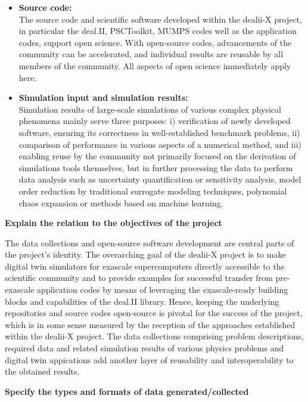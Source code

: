 \documentclass[a4paper,12pt]{article}
\begin{document}
\begin{itemize}
    \item  \textbf{Source code:}\\
    The source code and scientific software developed within the dealii-X project, in particular the deal.II, PSCToolkit, MUMPS codes well as the application codes, support open science. With open-source codes, advancements of the community can be accelerated, and individual results are reusable by all members of the community. All aspects of open science immediately apply here.  

    \item  \textbf{Simulation input and simulation results:}\\
    Simulation results of large-scale simulations of various complex physical phenomena mainly serve three purposes: i) verification of newly developed software, ensuring its correctness in well-established benchmark problems, ii) comparison of performance in various aspects of a numerical method, and iii) enabling reuse by the community not primarily focused on the derivation of simulations tools themselves, but in further processing the data to perform data analysis such as uncertainty quantification or sensitivity analysis, model order reduction by traditional surrogate modeling techniques, polynomial chaos expansion or methods based on machine learning.
\end{itemize}

\noindent \textbf{Explain the relation to the objectives of the project}

The data collections and open-source software development are central parts of the project's identity. The overarching goal of the dealii-X project is to make digital twin simulators for exascale supercomputers directly accessible to the scientific community and to provide examples for successful transfer from pre-exascale application codes by means of leveraging the exascale-ready building blocks and capabilities of the deal.II library. Hence, keeping the underlying repositories and source codes open-source is pivotal for the success of the project, which is in some sense measured by the reception of the approaches established within the dealii-X project. The data collections comprising problem descriptions, required data and related simulation results of various physics problems and digital twin appications add another layer of reusability and interoperability to the obtained results.

\noindent \textbf{Specify the types and formats of data generated/collected}
\end{document}
